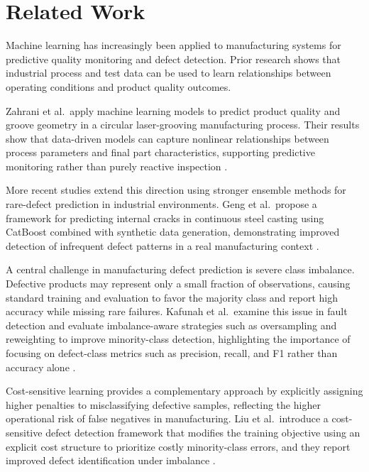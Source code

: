 \documentclass{article}
\begin{document}
\section{Related Work}
Machine learning has increasingly been applied to manufacturing systems for predictive quality monitoring and defect detection. Prior research shows that industrial process and test data can be used to learn relationships between operating conditions and product quality outcomes.

Zahrani et al.\ apply machine learning models to predict product quality and groove geometry in a circular laser-grooving manufacturing process. Their results show that data-driven models can capture nonlinear relationships between process parameters and final part characteristics, supporting predictive monitoring rather than purely reactive inspection \cite{zahrani2020lasergrooving}.

More recent studies extend this direction using stronger ensemble methods for rare-defect prediction in industrial environments. Geng et al.\ propose a framework for predicting internal cracks in continuous steel casting using CatBoost combined with synthetic data generation, demonstrating improved detection of infrequent defect patterns in a real manufacturing context \cite{geng2025ctgan}.

A central challenge in manufacturing defect prediction is severe class imbalance. Defective products may represent only a small fraction of observations, causing standard training and evaluation to favor the majority class and report high accuracy while missing rare failures. Kafunah et al.\ examine this issue in fault detection and evaluate imbalance-aware strategies such as oversampling and reweighting to improve minority-class detection, highlighting the importance of focusing on defect-class metrics such as precision, recall, and F1 rather than accuracy alone \cite{kafunah2021imbalanced}.

Cost-sensitive learning provides a complementary approach by explicitly assigning higher penalties to misclassifying defective samples, reflecting the higher operational risk of false negatives in manufacturing. Liu et al.\ introduce a cost-sensitive defect detection framework that modifies the training objective using an explicit cost structure to prioritize costly minority-class errors, and they report improved defect identification under imbalance \cite{liu2023costsensitiveyolov5}.
\end{document}
